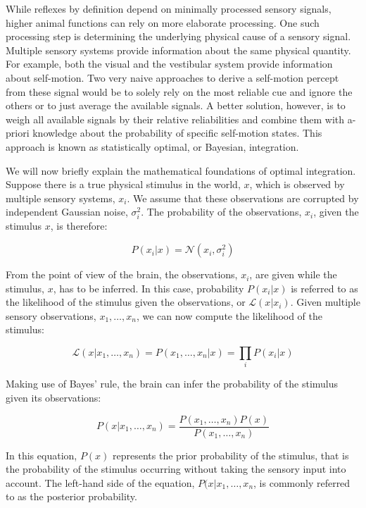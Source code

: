 While reflexes by definition depend on minimally processed sensory signals, higher animal functions can rely on more elaborate processing. One such processing step is determining the underlying physical cause of a sensory signal. Multiple sensory systems provide information about the same physical quantity. For example, both the visual and the vestibular system provide information about self-motion. Two very naive approaches to derive a self-motion percept from these signal would be to solely rely on the most reliable cue and ignore the others or to just average the available signals. A better solution, however, is to weigh all available signals by their relative reliabilities and combine them with a-priori knowledge about the probability of specific self-motion states. This approach is known as statistically optimal, or Bayesian, integration. 

We will now briefly explain the mathematical foundations of optimal integration. Suppose there is a true physical stimulus in the world, $x$, which is observed by multiple sensory systems, $x_i$. We assume that these observations are corrupted by independent Gaussian noise, $\sigma_i^2$. The probability of the observations, $x_i$, given the stimulus $x$, is therefore:

\begin{equation}
P(x_i|x)= \mathcal{N}(x_i, \sigma_i^2)
\end{equation}

From the point of view of the brain, the observations, $x_i$, are given while the stimulus, $x$, has to be inferred. In this case, probability $P(x_i|x)$ is referred to as the likelihood of the stimulus given the observations, or $\mathcal{L}(x|x_i)$. Given multiple sensory observations, $x_1,\dotsc,x_n$, we can now compute the likelihood of the stimulus:

\begin{equation}
\mathcal{L}(x|x_1,\dotsc,x_n) = P(x_1,\dotsc,x_n|x) = \prod_i P(x_i|x)
\end{equation}

Making use of Bayes' rule, the brain can infer the probability of the stimulus given its observations:

\begin{equation}
P(x|x_1,\dotsc,x_n) = \frac{P(x_1,\dotsc,x_n)P(x)}{P(x_1,\dotsc,x_n)}
\end{equation}

In this equation, $P(x)$ represents the prior probability of the stimulus, that is the probability of the stimulus occurring without taking the sensory input into account. The left-hand side of the equation, $P(x|x_1,\dotsc,x_n$, is commonly referred to as the posterior probability.

